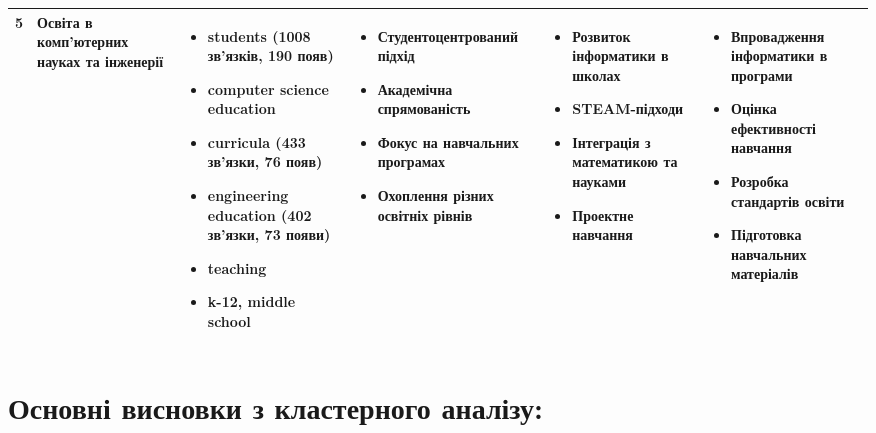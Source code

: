 {\begin{longtable}{|c|p{2.6cm}|p{3cm}|p{3.1cm}|p{3cm}|p{3cm}|}
\cellcolor{violet!20}5 & 
\textbf{Освіта в комп'ютерних науках та інженерії} & 
\begin{itemize}
    \item students (1008 зв'язків, 190 появ)
    \item computer science education
    \item curricula (433 зв'язки, 76 появ)
    \item engineering education (402 зв'язки, 73 появи)
    \item teaching
    \item k-12, middle school
\end{itemize} & 
\begin{itemize}
    \item Студенто\-центрований підхід
    \item Академічна спрямованість
    \item Фокус на навчальних програмах
    \item Охоплення різних освітніх рівнів
\end{itemize} & 
\begin{itemize}
    \item Розвиток інформатики в школах
    \item STEAM-підходи
    \item Інтеграція з математикою та науками
    \item Проектне навчання
\end{itemize} & 
\begin{itemize}
    \item Впровадження інформатики в програми
    \item Оцінка ефективності навчання
    \item Розробка стандартів освіти
    \item Підготовка навчальних матеріалів
\end{itemize} \\
\hline

\end{longtable}
}

\section*{Основні висновки з кластерного аналізу:}

